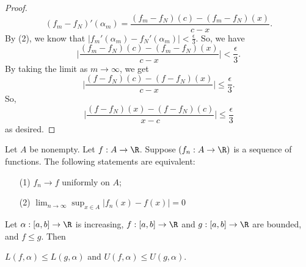 \begin{proof}
    \[  ({f}_{m}- {f}_{N})'({\alpha}_{m}) = \frac{ ({f}_{m}- {f}_{N})(c) - ({f}_{m}- {f}_{N})(x) }{  c - x  }.  \]
    By (2), we know that \( | {f}_{m}'({\alpha}_{m}) - {f}_{N}'({\alpha}_{m}) |  < \frac{ \epsilon }{ 3 } \). So, we have 
    \[  \Big| \frac{ ({f}_{m} - {f}_{N})(c)- ({f}_{m} - {f}_{N})(x) }{ c - x  }  \Big|  < \frac{ \epsilon }{ 3 }. \]
    By taking the limit as \( m \to \infty   \), we get
    \[  \Big| \frac{ (f - {f}_{N})(c) - (f - {f}_{N})(x) }{  c - x  }    \Big| \leq \frac{ \epsilon }{ 3 }.  \]
    So, 
    \[  \Big| \frac{ (f - {f}_{N})(x) - (f - {f}_{N})(c) }{  x - c  }   \Big|  \leq \frac{ \epsilon }{ 3 } \]
    as desired.
\end{proof}

\begin{lemma}[lemma 1]\label{lemma 1}
    Let \( A  \) be nonempty. Let \( f: A \to \R  \). Suppose \( ({f}_{n}: A \to \R ) \) is a sequence of functions. The following statements are equivalent:
    \begin{enumerate}
        \item[(1)] \( {f}_{n} \to f  \) uniformly on \( A  \);
        \item[(2)] \( \lim_{ n \to \infty  }  \sup_{x \in A } | {f}_{n}(x) - f(x) | = 0   \)
    \end{enumerate}
\end{lemma}

\begin{lemma}[lemma 2]\label{lemma 2}
    Let \( \alpha: [a,b] \to \R  \) is increasing, \( f: [a,b] \to \R  \) and \( g: [a,b] \to \R  \) are bounded, and \( f \leq g  \). Then     
    \begin{center}
        \( L(f,\alpha) \leq L(g, \alpha) \) and \( U(f,\alpha) \leq U(g,\alpha) \).
    \end{center}
\end{lemma}

